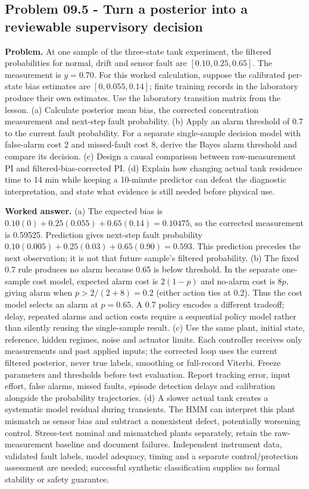 \documentclass[11pt,a4paper]{article}
\begin{document}
\subsection{Problem 09.5 - Turn a posterior into a reviewable supervisory decision}
\textbf{Problem.} At one sample of the three-state tank experiment, the filtered probabilities for normal, drift and sensor fault are $[0.10,0.25,0.65]$. The measurement is $y=0.70$. For this worked calculation, suppose the calibrated per-state bias estimates are $[0,0.055,0.14]$; finite training records in the laboratory produce their own estimates. Use the laboratory transition matrix from the lesson. (a) Calculate posterior mean bias, the corrected concentration measurement and next-step fault probability. (b) Apply an alarm threshold of 0.7 to the current fault probability. For a separate single-sample decision model with false-alarm cost 2 and missed-fault cost 8, derive the Bayes alarm threshold and compare its decision. (c) Design a causal comparison between raw-measurement PI and filtered-bias-corrected PI. (d) Explain how changing actual tank residence time to 14 min while keeping a 10-minute predictor can defeat the diagnostic interpretation, and state what evidence is still needed before physical use.


\textbf{Worked answer.} (a) The expected bias is $0.10(0)+0.25(0.055)+0.65(0.14)=0.10475$, so the corrected measurement is 0.59525. Prediction gives next-step fault probability $0.10(0.005)+0.25(0.03)+0.65(0.90)=0.593$. This prediction precedes the next observation; it is not that future sample's filtered probability. (b) The fixed 0.7 rule produces no alarm because 0.65 is below threshold. In the separate one-sample cost model, expected alarm cost is $2(1-p)$ and no-alarm cost is $8p$, giving alarm when $p>2/(2+8)=0.2$ (either action ties at 0.2). Thus the cost model selects an alarm at $p=0.65$. A 0.7 policy encodes a different tradeoff; delay, repeated alarms and action costs require a sequential policy model rather than silently reusing the single-sample result. (c) Use the same plant, initial state, reference, hidden regimes, noise and actuator limits. Each controller receives only measurements and past applied inputs; the corrected loop uses the current filtered posterior, never true labels, smoothing or full-record Viterbi. Freeze parameters and thresholds before test evaluation. Report tracking error, input effort, false alarms, missed faults, episode detection delays and calibration alongside the probability trajectories. (d) A slower actual tank creates a systematic model residual during transients. The HMM can interpret this plant mismatch as sensor bias and subtract a nonexistent defect, potentially worsening control. Stress-test nominal and mismatched plants separately, retain the raw-measurement baseline and document failures. Independent instrument data, validated fault labels, model adequacy, timing and a separate control/protection assessment are needed; successful synthetic classification supplies no formal stability or safety guarantee.
\end{document}
